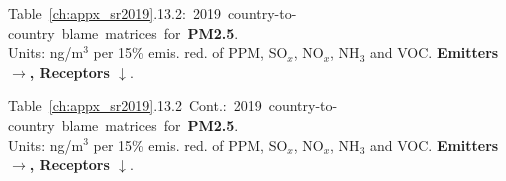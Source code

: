 
\footnotesize{\mbox{Table \ref{ch:appx_sr2019}.13.2: 2019 country-to-country blame matrices for \textbf{PM2.5}.}\\ Units: ng/m$^3$ per 15\% emis. red. of PPM, SO$_x$, NO$_x$, NH$_3$ and VOC. \textbf{Emitters $\rightarrow$, Receptors $\downarrow$}. }\\[\baselineskip]\enlargethispage{\myenlarge} \hspace{-0.5cm} 
\centerline{}\clearpage
\footnotesize{\mbox{Table \ref{ch:appx_sr2019}.13.2 Cont.: 2019 country-to-country blame matrices for \textbf{PM2.5}.}\\ Units: ng/m$^3$ per 15\% emis. red. of PPM, SO$_x$, NO$_x$, NH$_3$ and VOC. \textbf{Emitters $\rightarrow$, Receptors $\downarrow$}. }\\[\baselineskip]\enlargethispage{\myenlarge} \hspace{-0.5cm} 
\centerline{}\clearpage


